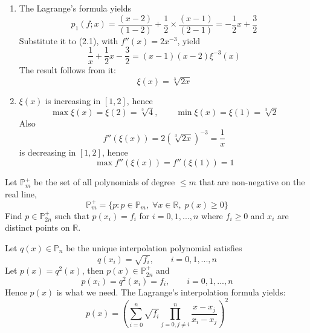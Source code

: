\documentclass[11pt]{elegantbook}
\begin{document}
\begin{solution}
  \begin{enumerate}
    \item The Lagrange's formula yields
    \begin{equation*}
      p_1(f;x) = \frac{(x-2)}{(1-2)} + \frac{1}{2}\times \frac{(x-1)}{(2-1)} = -\frac{1}{2}x+\frac{3}{2}
    \end{equation*}
    Substitute it to (2.1), with $f''(x)=2x^{-3}$, yield
    \begin{equation*}
      \frac{1}{x}+\frac{1}{2}x-\frac{3}{2} = (x-1)(x-2)\xi^{-3}(x)
    \end{equation*}
    The result follows from it:
    \begin{equation*}
      \xi(x)=\sqrt[3]{2x}
    \end{equation*}

    \item $\xi(x)$ is increasing in $[1,2]$, hence
    \begin{equation*}
      \max \xi(x)=\xi(2)=\sqrt[3]{4},\qquad \min \xi(x)=\xi(1) = \sqrt[3]{2}
    \end{equation*}
    Also
    \begin{equation*}
      f''(\xi(x))=2\left(\sqrt[3]{2x}\right)^{-3}=\frac{1}{x}
    \end{equation*}
    is decreasing in $[1,2]$, hence
    \begin{equation*}
      \max f''(\xi(x)) = f''(\xi(1)) = 1
    \end{equation*}
  \end{enumerate}
\end{solution}

\vspace{1.5em}

\begin{problem}
  Let $\mathbb{P}_m^+$ be the set of all polynomials of degree $\leq m$ that are non-negative on the real line,
  \begin{equation*}
    \mathbb{P}_m^+ = \{p:p\in \mathbb{P}_m,\; \forall x\in \mathbb{R}, \; p(x)\geq 0\}
  \end{equation*}
  Find $p\in \mathbb{P}_{2n}^+$ such that $p(x_i)=f_i$ for $i=0,1,...,n$ where $f_i\geq 0$ and $x_i$ are distinct points on $\mathbb{R}$.
\end{problem}

\begin{solution}
  Let $q(x)\in\mathbb{P}_n$ be the unique interpolation polynomial satisfies
  \begin{equation*}
    q(x_i)=\sqrt{f_i},\qquad i=0,1,...,n
  \end{equation*}
  Let $p(x)=q^2(x)$, then $p(x)\in \mathbb{P}_{2n}^+$ and
  \begin{equation*}
    p(x_i)=q^2(x_i)=f_i,\qquad i=0,1,...,n
  \end{equation*}
  Hence $p(x)$ is what we need. The Lagrange's interpolation formula yields:
  \begin{equation*}
    p(x)=\left(\sum_{i=0}^n \sqrt{f_i}\prod_{j=0,j\neq i}^n \frac{x-x_j}{x_i-x_j}\right)^2
  \end{equation*}
\end{solution}
\end{document}
